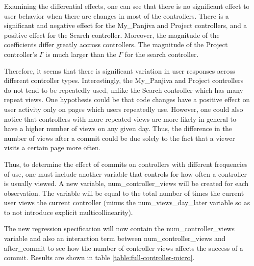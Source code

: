 \documentclass[12pt]{article}
\begin{document}
Examining the differential effects, one can see that there is no significant effect to user behavior when there are changes in most of the controllers. There is a significant and negative effect for the My\_Panjiva and Project controllers, and a positive effect for the Search controller. Moreover, the magnitude of the coefficients differ greatly accross controllers. The magnitude of the Project controller's $\Gamma$ is much larger than the $\Gamma$ for the search controller. 

Therefore, it seems that there is significant variation in user responses across different controller types. Interestingly, the My\_Panjiva and Project controllers do not tend to be repeatedly used, unlike the Search controller which has many repeat views. One hypothesis could be that code changes have a positive effect on user activity only on pages which users repeatedly use. However, one could also notice that controllers with more repeated views are more likely in general to have a higher number of views on any given day. Thus, the difference in the number of views after a commit could be due solely to the fact that a viewer visits a certain page more often.

Thus, to determine the effect of commits on controllers with different frequencies of use, one must include another variable that controls for how often a controller is usually viewed. A new variable, num\_controller\_views will be created for each observation. The variable will be equal to the total number of times the current user views the current controller (minus the num\_views\_day\_later variable so as to not introduce explicit multicollinearity). 

The new regression specification will now contain the num\_controller\_views variable and also an interaction term between num\_controller\_views and after\_commit to see how the number of controller views affects the success of a commit. Results are shown in table \ref{table:full-controller-micro}.
\end{document}
